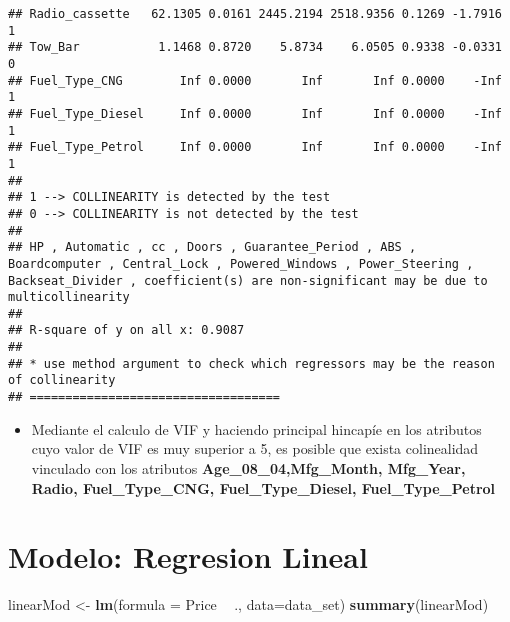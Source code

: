 \documentclass[]{article}
\newenvironment{Shaded}{\begin{snugshade}}{\end{snugshade}}
\newcommand{\DataTypeTok}[1]{\textcolor[rgb]{0.13,0.29,0.53}{#1}}
\newcommand{\KeywordTok}[1]{\textcolor[rgb]{0.13,0.29,0.53}{\textbf{#1}}}
\newcommand{\NormalTok}[1]{#1}
\newcommand{\OperatorTok}[1]{\textcolor[rgb]{0.81,0.36,0.00}{\textbf{#1}}}
\newcommand{\StringTok}[1]{\textcolor[rgb]{0.31,0.60,0.02}{#1}}
\providecommand{\tightlist}{%
  \setlength{\itemsep}{0pt}\setlength{\parskip}{0pt}}
\begin{document}
\begin{verbatim}
## Radio_cassette   62.1305 0.0161 2445.2194 2518.9356 0.1269 -1.7916     1
## Tow_Bar           1.1468 0.8720    5.8734    6.0505 0.9338 -0.0331     0
## Fuel_Type_CNG        Inf 0.0000       Inf       Inf 0.0000    -Inf     1
## Fuel_Type_Diesel     Inf 0.0000       Inf       Inf 0.0000    -Inf     1
## Fuel_Type_Petrol     Inf 0.0000       Inf       Inf 0.0000    -Inf     1
## 
## 1 --> COLLINEARITY is detected by the test 
## 0 --> COLLINEARITY is not detected by the test
## 
## HP , Automatic , cc , Doors , Guarantee_Period , ABS , Boardcomputer , Central_Lock , Powered_Windows , Power_Steering , Backseat_Divider , coefficient(s) are non-significant may be due to multicollinearity
## 
## R-square of y on all x: 0.9087 
## 
## * use method argument to check which regressors may be the reason of collinearity
## ===================================
\end{verbatim}

\begin{itemize}
\tightlist
\item
  Mediante el calculo de VIF y haciendo principal hincapíe en los
  atributos cuyo valor de VIF es muy superior a 5, es posible que exista
  colinealidad vinculado con los atributos
  \textbf{Age\_08\_04,Mfg\_Month, Mfg\_Year, Radio, Fuel\_Type\_CNG,
  Fuel\_Type\_Diesel, Fuel\_Type\_Petrol}
\end{itemize}

\hypertarget{modelo-regresion-lineal}{%
\section{Modelo: Regresion Lineal}\label{modelo-regresion-lineal}}

\begin{Shaded}
\begin{Highlighting}[]
\NormalTok{linearMod <-}\StringTok{ }\KeywordTok{lm}\NormalTok{(}\DataTypeTok{formula =}\NormalTok{ Price }\OperatorTok{~}\StringTok{ }\NormalTok{., }\DataTypeTok{data=}\NormalTok{data_set)}
\KeywordTok{summary}\NormalTok{(linearMod)}
\end{Highlighting}
\end{Shaded}
\end{document}
